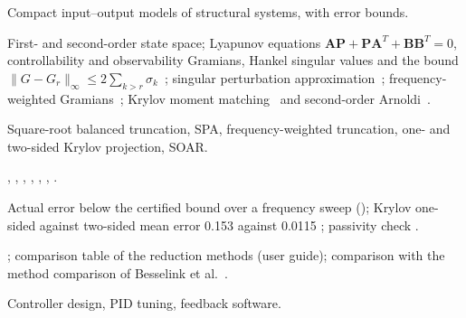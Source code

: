 \begin{description}[style=nextline,leftmargin=1em]
\item[Focus] Compact input--output models of structural systems, with error bounds.
\item[Mathematics] First- and second-order state space; Lyapunov equations $\bm A\bm P+\bm P\bm A^T+\bm B\bm B^T=0$, controllability and observability Gramians, Hankel singular values and the bound $\|G-G_r\|_\infty\le 2\sum_{k>r}\sigma_k$~\cite{moore1981,glover1984}; singular perturbation approximation~\cite{liu1989spa}; frequency-weighted Gramians~\cite{enns1984}; Krylov moment matching~\cite{antoulas2005} and second-order Arnoldi~\cite{bai2005soar}.
\item[Algorithm] Square-root balanced truncation, SPA, frequency-weighted truncation, one- and two-sided Krylov projection, SOAR.
\item[Implementation] , , , , , , .
\item[Verification] Actual error below the certified bound over a frequency sweep \have{} (); Krylov one-sided against two-sided mean error 0.153 against 0.0115 \have{}; passivity check \have{}.
\item[Figures and tables] ; comparison table of the reduction methods \have{} (user guide); comparison with the method comparison of Besselink et al.~\cite{besselink2013comparison}.
\item[Exclusions] Controller design, PID tuning, feedback software.
\end{description}

